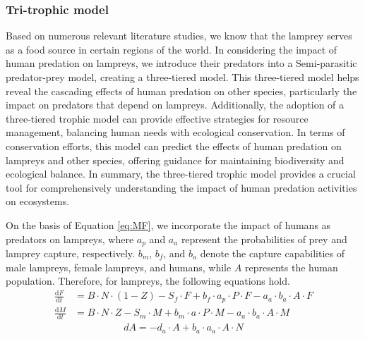\documentclass[CTeX = true]{mcmthesis}  %
\begin{document}
\subsubsection{Tri-trophic model}
Based on numerous relevant literature studies, we know that the lamprey serves as a food source in certain regions of the world. In considering the impact of human predation on lampreys, we introduce their predators into a Semi-parasitic predator-prey model, creating a three-tiered model. This three-tiered model helps reveal the cascading effects of human predation on other species, particularly the impact on predators that depend on lampreys. Additionally, the adoption of a three-tiered trophic model can provide effective strategies for resource management, balancing human needs with ecological conservation. In terms of conservation efforts, this model can predict the effects of human predation on lampreys and other species, offering guidance for maintaining biodiversity and ecological balance. In summary, the three-tiered trophic model provides a crucial tool for comprehensively understanding the impact of human predation activities on ecosystems.


On the basis of Equation \ref{eq:MF}, we incorporate the impact of humans as predators on lampreys, where $a_p$ and $a_a$ represent the probabilities of prey and lamprey capture, respectively. $b_m$, $b_f$, and $b_a$ denote the capture capabilities of male lampreys, female lampreys, and humans, while $A$ represents the human population. Therefore, for lampreys, the following equations hold.
\begin{equation}
\begin{aligned}
\frac{\mathrm{d} F}{\mathrm{d} t} &= B\cdot N\cdot (1-Z)-S_{f}\cdot F+b_{f}\cdot a_p \cdot P \cdot F - a_a \cdot b_a \cdot A \cdot F \\
\frac{\mathrm{d} M}{\mathrm{d} t} &= B\cdot N\cdot Z-S_{m}\cdot M+b_{m}\cdot a \cdot P \cdot M - a_a \cdot b_a \cdot A \cdot M
\end{aligned}
\end{equation}
\begin{equation}
\begin{aligned}
dA = - d_a \cdot A + b_a \cdot a_a \cdot A \cdot N
\end{aligned}
\end{equation}
\end{document}
